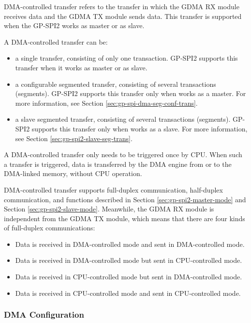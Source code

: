 \documentclass[main\_\_EN.tex]{subfiles}
\begin{document}
DMA-controlled transfer refers to the transfer in which the GDMA RX module receives data and the GDMA TX module sends data. This transfer is supported when the GP-SPI2 works as master or as slave.

A DMA-controlled transfer can be:

\begin{itemize}
    \item a single transfer, consisting of only one transaction. GP-SPI2 supports this transfer when it works as master or as slave.
    \item a configurable segmented transfer, consisting of several transactions (segments). GP-SPI2 supports this transfer only when works as a master. For more information, see Section \ref{sec:gp-spi-dma-seg-conf-trans}.
    \item a slave segmented transfer, consisting of several transactions (segments). GP-SPI2 supports this transfer only when works as a slave. For more information, see Section \ref{sec:gp-spi2-slave-seg-trans}.
\end{itemize}

A DMA-controlled transfer only needs to be triggered once by CPU. When such a transfer is triggered, data is transferred by the DMA engine from or to the DMA-linked memory, without CPU operation.

DMA-controlled transfer supports full-duplex communication, half-duplex communication, and functions described in Section \ref{sec:gp-spi2-master-mode} and Section \ref{sec:gp-spi2-slave-mode}. Meanwhile, the GDMA RX module is independent from the GDMA TX module, which means that there are four kinds of full-duplex communications:

\begin{itemize}
    \item Data is received in DMA-controlled mode and sent in DMA-controlled mode.
    \item Data is received in DMA-controlled mode but sent in CPU-controlled mode.
    \item Data is received in CPU-controlled mode but sent in DMA-controlled mode.
    \item Data is received in CPU-controlled mode and sent in CPU-controlled mode.
\end{itemize}

\subsubsection{DMA Configuration}\label{sec:DMA-conf}
\end{document}
